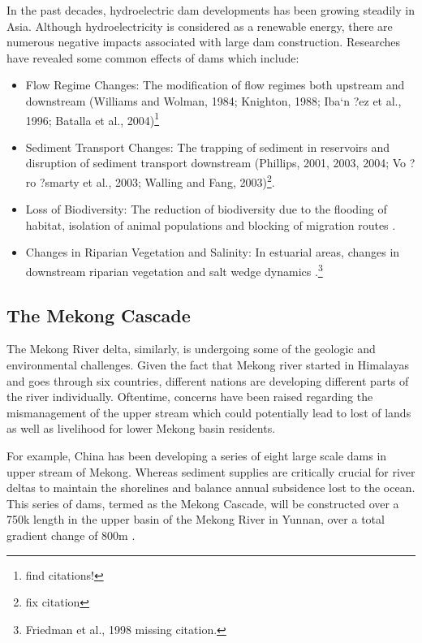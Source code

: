   In the past decades, hydroelectric dam developments has been growing steadily in Asia. Although hydroelectricity is considered as a renewable energy, there are numerous negative impacts associated with large dam construction. Researches have revealed some common effects of dams which include:
  
\begin{itemize}
	\item Flow Regime Changes: The modification of flow regimes both upstream and downstream (Williams and Wolman, 1984; Knighton, 1988; Iba`n ?ez et al., 1996; Batalla et al., 2004)\footnote{find citations!}
	
	\item Sediment Transport Changes: The trapping of sediment in reservoirs and disruption of sediment transport downstream (Phillips, 2001, 2003, 2004; Vo ?ro ?smarty et al., 2003; Walling and Fang, 2003)\footnote{fix citation}. 
  
	\item Loss of Biodiversity: The reduction of biodiversity due to the flooding of habitat, isolation of animal populations and blocking of migration routes \citep{gehrke1995river,  kingsford2000ecological, bunn2002basic}.

	\item Changes in Riparian Vegetation and Salinity: In estuarial areas, changes in downstream riparian vegetation and salt wedge dynamics \citep{wolanski1996fine, allison1998historical}.\footnote{Friedman et al., 1998 missing citation.}
\end{itemize}

\subsection{The Mekong Cascade}

The Mekong River delta, similarly, is undergoing some of the geologic and environmental challenges. Given the fact that Mekong river started in Himalayas and goes through six countries, different nations are developing different parts of the river individually. Oftentime, concerns have been raised regarding the mismanagement of the upper stream which could potentially lead to lost of lands as well as livelihood for lower Mekong basin residents. 

For example, China has been developing a series of eight large scale dams in upper stream of Mekong. Whereas sediment supplies are critically crucial for river deltas to maintain the shorelines and balance annual subsidence lost to the ocean. This series of dams, termed as the Mekong Cascade, will be constructed over a 750k length in the upper basin of the Mekong River in Yunnan, over a total gradient change of 800m \citep{plinston1999water}. 

